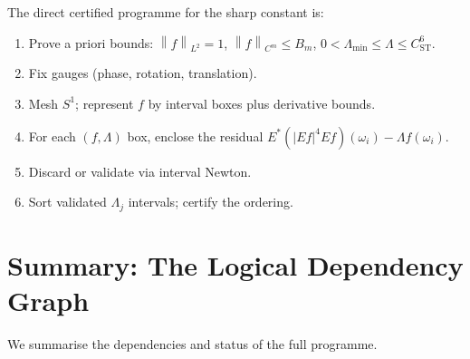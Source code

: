 \documentclass[12pt]{article}
\theoremstyle{definition}
\theoremstyle{remark}
\newcommand{\norm}[1]{\left\|#1\right\|}
\begin{document}
The direct certified programme for the sharp constant is:
\begin{enumerate}[leftmargin=2em]
  \item Prove a priori bounds:
    $\norm{f}_{L^2}=1$, $\norm{f}_{C^m}\leq B_m$,
    $0<\Lambda_{\min}\leq\Lambda\leq C_{\mathrm{ST}}^6$.
  \item Fix gauges (phase, rotation, translation).
  \item Mesh $S^1$; represent $f$ by interval boxes plus derivative bounds.
  \item For each $(f,\Lambda)$ box, enclose the residual
    $E^*(|Ef|^4Ef)(\omega_i)-\Lambda f(\omega_i)$.
  \item Discard or validate via interval Newton.
  \item Sort validated $\Lambda_j$ intervals; certify the ordering.
\end{enumerate}

\section{Summary: The Logical Dependency Graph}
\label{sec:dependency}

We summarise the dependencies and status of the full programme.
\end{document}
